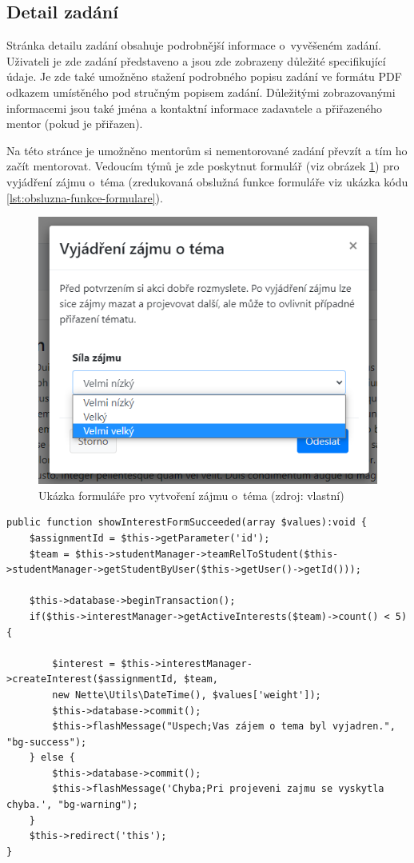 \documentclass[czech,BP]{thesiskiv}
\begin{document}
	\subsection{Detail zadání}
	\par Stránka detailu zadání obsahuje podrobnější informace o~vyvěšeném zadání. Uživateli je zde zadání představeno a jsou zde zobrazeny důležité specifikující údaje. Je zde také umožněno stažení podrobného popisu zadání ve formátu PDF odkazem umístěného pod stručným popisem zadání. Důležitými zobrazovanými informacemi jsou také jména a kontaktní informace zadavatele a přiřazeného mentor (pokud je přiřazen).
	\par Na této stránce je umožněno mentorům si nementorované zadání převzít a tím ho začít mentorovat. Vedoucím týmů je zde poskytnut formulář (viz obrázek \ref{fig:ukazka_formular}) pro vyjádření zájmu o~téma (zredukovaná obslužná funkce formuláře viz ukázka kódu \ref{lst:obsluzna-funkce-formulare}).
	
	\begin{figure}[H]
		\centering
		\includegraphics[width=\textwidth]{img/ukazky/formular}
		\caption{Ukázka formuláře pro vytvoření zájmu o~téma (zdroj: vlastní)}
		\label{fig:ukazka_formular}
	\end{figure}
\begin{lstlisting}[caption={Zkrácený úryvek funkce obsluhy formuláře pro projevení zájmu},label={lst:obsluzna-funkce-formulare}]
public function showInterestFormSucceeded(array $values):void {
	$assignmentId = $this->getParameter('id');
	$team = $this->studentManager->teamRelToStudent($this->studentManager->getStudentByUser($this->getUser()->getId()));
	
	$this->database->beginTransaction();
	if($this->interestManager->getActiveInterests($team)->count() < 5) {
		
		$interest = $this->interestManager->createInterest($assignmentId, $team,
		new Nette\Utils\DateTime(), $values['weight']);
		$this->database->commit();
		$this->flashMessage("Uspech;Vas zájem o tema byl vyjadren.", "bg-success");
	} else {
		$this->database->commit();
		$this->flashMessage('Chyba;Pri projeveni zajmu se vyskytla chyba.', "bg-warning");
	}
	$this->redirect('this');
}
\end{lstlisting}
\end{document}
